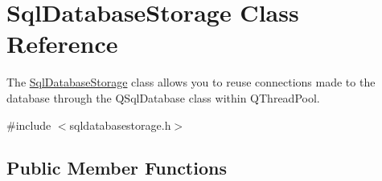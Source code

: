 \hypertarget{class_sql_database_storage}{}\section{Sql\+Database\+Storage Class Reference}
\label{class_sql_database_storage}


The \mbox{\hyperlink{class_sql_database_storage}{Sql\+Database\+Storage}} class allows you to reuse connections made to the database through the Q\+Sql\+Database class within Q\+Thread\+Pool.  




{\ttfamily \#include $<$sqldatabasestorage.\+h$>$}

\subsection*{Public Member Functions}
